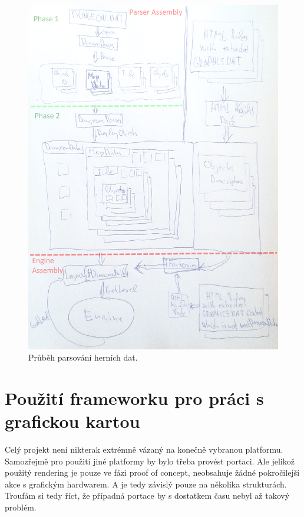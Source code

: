 \begin{figure}[p]\centering
\includegraphics[width=\textwidth]{./img/DM-parser.png}
\caption{Průběh parsování herních dat.}
\label{parser:analyza}
\end{figure}

\section{Použití frameworku pro práci s grafickou kartou}

Celý projekt není nikterak extrémně vázaný na konečně vybranou platformu. Samozřejmě pro použití jiné platformy by bylo 
třeba provést portaci. Ale jelikož použitý rendering je pouze ve fázi proof of concept, neobsahuje žádné pokročilejší akce
s grafickým hardwarem. A je tedy závislý pouze na několika strukturách. Troufám si tedy říct, že případná portace by s dostatkem
času nebyl až takový problém.

